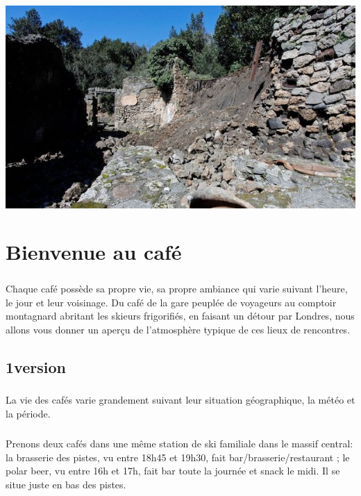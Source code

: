 \begin{center}
	\includegraphics[scale=0.5]{Pompei.jpg}
\end{center}

\chapter{Bienvenue au café}

\paragraph{} Chaque café possède sa propre vie, sa propre ambiance qui varie
suivant l'heure, le jour et leur voisinage. Du café de la gare peuplée de
voyageurs au comptoir montagnard abritant les skieurs frigorifiés, en faisant
un détour par Londres, nous allons vous donner un aperçu de l'atmosphère
typique de ces lieux de rencontres.

\section{1\iere version}

\paragraph{} La vie des cafés varie grandement suivant leur situation
géographique, la météo et la période.

\paragraph{} Prenons deux cafés dans une même station de ski familiale dans le
massif central: la brasserie des pistes, vu entre 18h45 et 19h30, fait
bar/brasserie/restaurant ; le polar beer, vu entre 16h et 17h, fait bar toute
la journée et snack le midi. Il se situe juste en bas des pistes.


